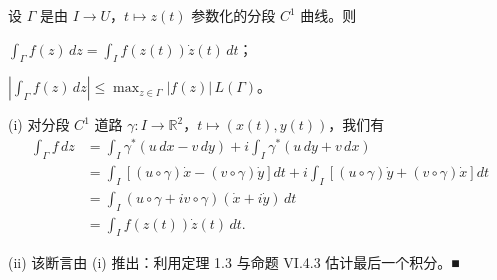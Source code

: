 \begin{proposition}

设 $ \Gamma $ 是由 $ I \to U $，$ t \mapsto z(t) $ 参数化的分段 $ C^{1} $ 曲线。则

\begin{subitems}
\item

$ \int_{\Gamma}f(z)\,dz = \int_{I}f(z(t))\dot{z}(t)\,dt $；

\item

$ \left|\int_{\Gamma}f(z)\,dz\right| \le \max_{z\in\Gamma}|f(z)|\,L(\Gamma) $。

\proofhead
(i) 对分段 $ C^{1} $ 道路 $ \gamma : I \to \mathbb{R}^{2} $，$ t \mapsto (x(t),y(t)) $，我们有
\begin{equation*}
\begin{aligned}
\int_{\Gamma} f\,dz &= \int_{I}\gamma^{*}(u\,dx - v\,dy) + i\int_{I}\gamma^{*}(u\,dy + v\,dx) \\ &= \int_{I}\left[(u\circ\gamma)\dot{x} - (v\circ\gamma)\dot{y}\right]dt + i\int_{I}\left[(u\circ\gamma)\dot{y} + (v\circ\gamma)\dot{x}\right]dt \\ &= \int_{I}(u\circ\gamma + iv\circ\gamma)(\dot{x} + i\dot{y})\,dt \\ &= \int_{I}f(z(t))\dot{z}(t)\,dt .
\end{aligned}
\end{equation*}
\end{subitems}

(ii) 该断言由 (i) 推出：利用定理 1.3 与命题 VI.4.3 估计最后一个积分。\nobreak\hspace{0.35em}■

\end{proposition}

